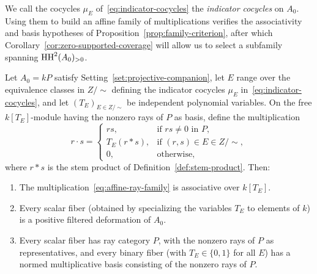 We call the cocycles $\mu_E$ of~\eqref{eq:indicator-cocycles} the \emph{indicator cocycles} on $A_0$. Using them to build an affine family of multiplications verifies the associativity and basis hypotheses of Proposition~\ref{prop:family-criterion}, after which Corollary~\ref{cor:zero-supported-coverage} will allow us to select a subfamily spanning $\operatorname{HH}^2(A_0)_{>0}$.

\begin{proposition}
\label{prop:zero-product-family}
Let $A_0=kP$ satisfy Setting~\ref{set:projective-companion}, let $E$ range over the equivalence classes in $Z/{\sim}$ defining the indicator cocycles $\mu_E$ in~\eqref{eq:indicator-cocycles}, and let $(T_E)_{E\in Z/{\sim}}$ be independent polynomial variables. On the free $k[T_E]$-module having the nonzero rays of $P$ as basis, define the multiplication
\begin{equation}
  r\cdot s=
  \begin{cases}
  rs, & \text{if }rs\ne0\text{ in }P,\\
  T_E(r*s), & \text{if }(r,s)\in E\in Z/{\sim},\\
  0, & \text{otherwise},
  \end{cases}
  \label{eq:affine-ray-family}
\end{equation}
where $r*s$ is the stem product of Definition~\ref{def:stem-product}. Then:
\begin{enumerate}[label={\upshape(\arabic*)}]
\item The multiplication~\eqref{eq:affine-ray-family} is associative over $k[T_E]$.
\item Every scalar fiber (obtained by specializing the variables $T_E$ to elements of $k$) is a positive filtered deformation of $A_0$.
\item Every scalar fiber has ray category $P$, with the nonzero rays of $P$ as representatives, and every binary fiber (with $T_E\in\{0,1\}$ for all $E$) has a normed multiplicative basis consisting of the nonzero rays of $P$.
\end{enumerate}
\end{proposition}
